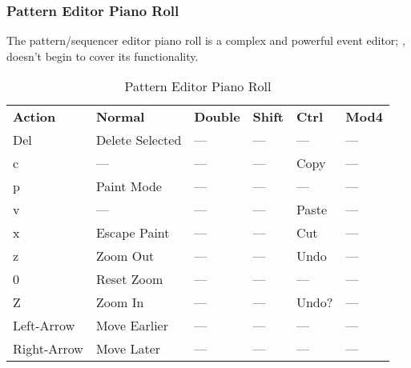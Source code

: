 \subsubsection{Pattern Editor Piano Roll}
\label{subsubsec:kbd_mouse_pattern_editor_piano_roll}

   The pattern/sequencer editor piano roll is a complex and powerful event
   editor;
   ,
   doesn't begin to cover its functionality.

   \begin{table}
      \centering
      \caption{Pattern Editor Piano Roll}
      \label{table:pattern_editor_piano_roll}
      \begin{tabular}{l l l l l l}
         \textbf{Action}   & \textbf{Normal} & \textbf{Double}    & 
            \textbf{Shift} & \textbf{Ctrl}   & \textbf{Mod4}      \\
         Del               & Delete Selected & ---                &
            ---            & ---             & ---                \\
         c                 & ---             & ---                &
            ---            & Copy            & ---                \\
         p                 & Paint Mode      & ---                &
            ---            & ---             & ---                \\
         v                 & ---             & ---                &
            ---            & Paste           & ---                \\
         x                 & Escape Paint    & ---                &
            ---            & Cut             & ---                \\
         z                 & Zoom Out        & ---                &
            ---            & Undo            & ---                \\
         0                 & Reset Zoom      & ---                &
            ---            & ---             & ---                \\
         Z                 & Zoom In         & ---                &
            ---            & Undo?           & ---                \\
         Left-Arrow        & Move Earlier    & ---                &
            ---            & ---             & ---                \\
         Right-Arrow       & Move Later      & ---                &
            ---            & ---             & ---                \\

\end{tabular}
\end{table}
